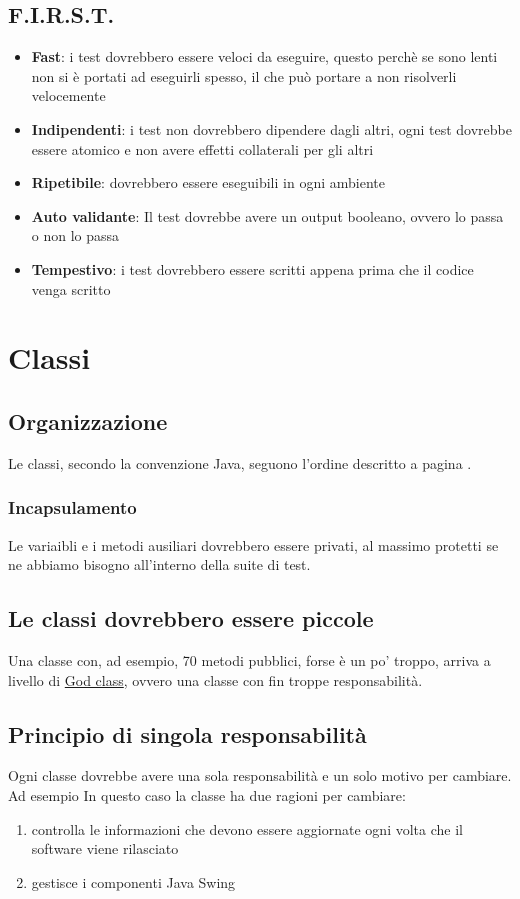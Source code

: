 \documentclass[11pt,a4paper]{book}
\begin{document}
\section{F.I.R.S.T.}
\begin{itemize}
	\item[] \textbf{Fast}: i test dovrebbero essere veloci da eseguire, questo perchè se sono lenti non si è portati ad eseguirli spesso, il che può portare a non risolverli velocemente
	\item[] \textbf{Indipendenti}: i test non dovrebbero dipendere dagli altri, ogni test dovrebbe essere atomico e non avere effetti collaterali per gli altri 
	\item[] \textbf{Ripetibile}: dovrebbero essere eseguibili in ogni ambiente  
	\item[] \textbf{Auto validante}: Il test dovrebbe avere un output booleano, ovvero lo passa o non lo passa 
	\item[] \textbf{Tempestivo}: i test dovrebbero essere scritti appena prima che il codice venga scritto 
\end{itemize}

\chapter{Classi}
\section{Organizzazione}
Le classi, secondo la convenzione Java, seguono l'ordine descritto a pagina \pageref{par: formattazioneVerticale}.

\subsection{Incapsulamento}
Le variaibli e i metodi ausiliari dovrebbero essere privati, al massimo protetti se ne abbiamo bisogno all'interno della suite di test.

\section{Le classi dovrebbero essere piccole}
Una classe con, ad esempio, 70 metodi pubblici, forse è un po' troppo, arriva a livello di \href{https://en.wikipedia.org/wiki/God_object}{God class}, ovvero una classe con fin troppe responsabilità.

\section{Principio di singola responsabilità}
Ogni classe dovrebbe avere una sola responsabilità e un solo motivo per cambiare. Ad esempio
\label{code: 055}
In questo caso la classe ha due ragioni per cambiare:
\begin{enumerate}
	\item controlla le informazioni che devono essere aggiornate ogni volta che il software viene rilasciato
	\item gestisce i componenti Java Swing
\end{enumerate}
\end{document}
